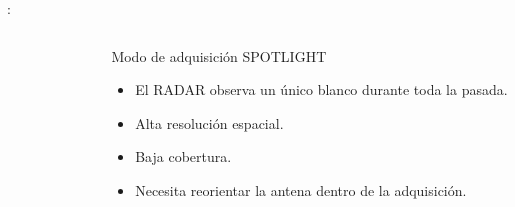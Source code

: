 \begin{frame}{\secname : \subsecname}
  \begin{columns}
    \begin{column}{0.5\textwidth}
       \begin{figure}
         \centering
         \label{}
       \end{figure}
    \end{column}
    \begin{column}{0.5\textwidth}  %
      \begin{block}{Modo de adquisición SPOTLIGHT}
        \begin{itemize}
          \item El RADAR observa un único blanco durante toda la pasada.
          \item Alta resolución espacial.
          \item Baja cobertura.
          \item Necesita reorientar la antena dentro de la adquisición.
        \end{itemize}
      \end{block}
    \end{column}
    \end{columns}
\end{frame}

